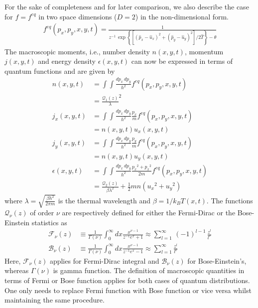 \documentclass{rsproca}%
\begin{document}
For the sake of completeness and for later comparison, we also describe the case for $f=f^{eq}$ in two space dimensions ($D=2$) in the non-dimensional form.
\begin{align}
f^{eq}(p_x,p_y,x,y,t) = 
\frac{1}{z^{-1}\,\exp\left\{ \left[ (\hat{p}_x- \hat{u}_x)^2 + (\hat{p}_y- \hat{u}_y)^2 \right]/2\hat{T} \right\} -\theta}
\end{align}
The macroscopic moments, i.e., number density \(n(x,y,t)\), momentum \(j(x,y,t)\) and energy density \(\epsilon(x,y,t)\) can now be expressed in terms of quantum functions and are given by
\begin{subequations}
\begin {align}
n(x,y,t) &= \int\int{\frac{dp_x\,dp_y}{h^2}f^{eq}(p_x,p_y,x,y,t)}\nonumber \\
&= \frac{\mathcal{Q}_{1}(z)}{\lambda}^2  \\
j_x(x,y,t) &= \int\int{\frac{dp_x\,dp_y}{h^2}\frac{p_x}{m}f^{eq}(p_x,p_y,x,y,t)}\nonumber \\
&= n(x,y,t)u_x(x,y,t)  \\
j_y(x,y,t) &= \int\int{\frac{dp_x\,dp_y}{h^2}\frac{p_y}{m}f^{eq}(p_x,p_y,x,y,t)}\nonumber \\
&= n(x,y,t)u_y(x,y,t)  \\
\epsilon(x,y,t) &= \int\int{\frac{dp_x\,dp_y}{h^2}\frac{{p_x}^2+{p_x}^2}{2m}f^{eq}(p_x,p_y,x,y,t)}\nonumber \\
&= \frac{\mathcal{Q}_{2}(z)}{\beta\lambda^2}+\frac{1}{2}mn({u_x}^2+{u_y}^2) 
\end{align}
\end{subequations}
where \(\lambda=\sqrt{\frac{\beta h^2}{2\pi m}}\) is the thermal wavelength and \(\beta=1/k_{B} T(x,t)\).  The functions $\mathcal{Q}_{\nu}(z)$ of order $\nu$ are respectively defined for either the Fermi-Dirac or the Bose-Einstein statistics as
\begin {align}
\mathcal{F}_{\nu}(z)&\equiv \frac{1}{\Gamma(\nu)} \int^{\infty}_{0}{dx\frac{x^{\nu -1}}{z^{-1}e^{x} +1}}\approx\sum^{\infty}_{l=1}\,(-1)^{l-1}\,{\frac{z^l}{l^\nu}}\\
\mathcal{B}_{\nu}(z)&\equiv \frac{1}{\Gamma(\nu)} \int^{\infty}_{0}{dx\frac{x^{\nu-1}}{z^{-1}e^{x}-1}}\approx\sum^{\infty}_{l=1}{\frac{z^l}{l^\nu}}
\end{align}
Here,  \(\mathcal{F}_{\nu}(z)\) applies for Fermi-Dirac integral and \(\mathcal{B}_{\nu}(z)\) for Bose-Einstein's, whereas \(\Gamma(\nu)\) is gamma function. The definition of macroscopic quantities in terms of Fermi or Bose function applies for both cases of quantum distributions. One only needs to replace Fermi function with Bose function or vice versa whilst maintaining the same procedure.
\end{document}
